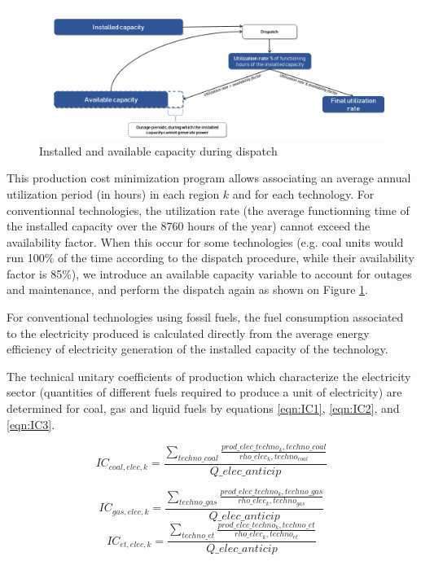 \begin{figure}[H]
\includegraphics[scale=0.4]{figures&tables/availb.png}
\centering
\caption{Installed and available capacity during dispatch}
\label{fig:avail}
\end{figure}


This production cost minimization program allows  associating an average annual utilization period (in hours) in each region $k$ and for each technology. For conventionnal technologies, the utilization rate (the average functionning time of the installed capacity over the 8760 hours of the year) cannot exceed the availability factor. When this occur for some technologies (e.g. coal units would run 100\% of the time according to the dispatch procedure, while their availability factor is 85\%), we introduce an available capacity variable to account for outages and maintenance, and perform the dispatch again as shown on Figure \ref{fig:avail}. 

For conventional technologies using fossil fuels, the fuel consumption associated to the electricity produced is calculated directly from the average energy efficiency of electricity generation of the installed capacity of the technology.

The technical unitary coefficients of production which characterize the electricity sector (quantities of different fuels required to produce a unit of electricity) are determined for coal, gas and liquid fuels by equations \ref{eqn:IC1}, \ref{eqn:IC2}, and  \ref{eqn:IC3}.

\begin{equation}
    IC_{coal,elec,k} = \frac{\sum_{techno\_coal}  \frac{prod\_elec\_techno_k,techno\_coal}{rho\_elec_k,techno_{coal}}}{Q\_elec\_anticip}
    \label{eqn:IC1}
\end{equation}

\begin{equation}
    IC_{gas,elec,k} = \frac{\sum_{techno\_gas}  \frac{prod\_elec\_techno_k,techno\_gas}{rho\_elec_k,techno_{gas}}}{Q\_elec\_anticip}
    \label{eqn:IC2}
\end{equation}
\begin{equation}
    IC_{et,elec,k} = \frac{\sum_{techno\_et}  \frac{prod\_elec\_techno_k,techno\_et}{rho\_elec_k,techno_{et}}}{Q\_elec\_anticip}
    \label{eqn:IC3}
\end{equation}

